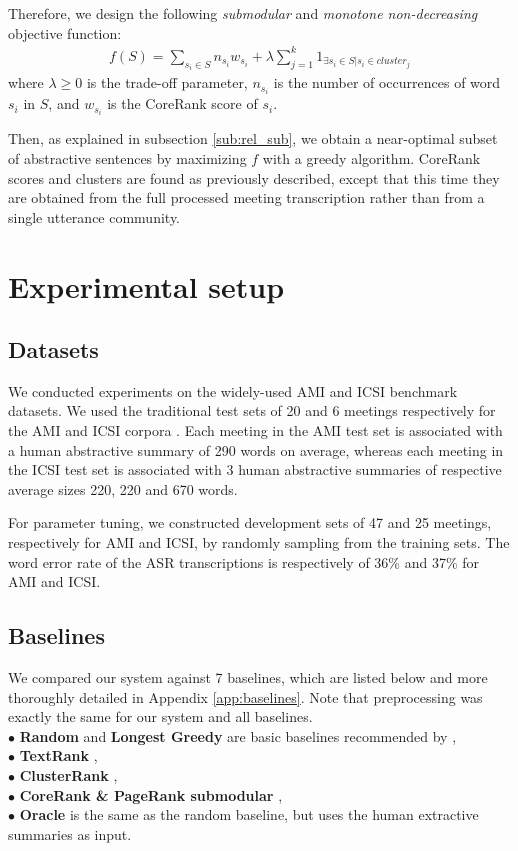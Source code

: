 \documentclass[11pt,a4paper]{article}
\begin{document}
Therefore, we design the following \textit{submodular} and \textit{monotone non-decreasing} objective function:
\begin{equation}
\begin{aligned}
f(S) = \sum_{s_i \in S} n_{s_i} w_{s_i} + \lambda \sum^k_{j = 1} 1_{\exists s_i \in S | s_i \in cluster_j}
\end{aligned}
\label{eq:obj}
\end{equation}
where $\lambda \geq 0$ is the trade-off parameter, $n_{s_i}$ is the number of occurrences of word $s_i$ in $S$, and $w_{s_i}$ is the CoreRank score of $s_i$.

Then, as explained in subsection \ref{sub:rel_sub}, we obtain a near-optimal subset of abstractive sentences by maximizing $f$ with a greedy algorithm. CoreRank scores and clusters are found as previously described, except that this time they are obtained from the full processed meeting transcription rather than from a single  utterance community.

\section{Experimental setup}

\subsection{Datasets} \label{subsec:datasets}
We conducted experiments on the widely-used AMI \cite{mccowan2005ami} and ICSI \cite{janin2003icsi} benchmark datasets. We used the traditional test sets of 20 and 6 meetings respectively for the AMI and ICSI corpora \cite{riedhammer2008packing}. Each meeting in the AMI test set is associated with a human abstractive summary of 290 words on average, whereas each meeting in the ICSI test set is associated with 3 human abstractive summaries of respective average sizes 220, 220 and 670 words. 

For parameter tuning, we constructed development sets of 47 and 25 meetings, respectively for AMI and ICSI, by randomly sampling from the training sets. The word error rate of the ASR transcriptions is respectively of 36\% and 37\% for AMI and ICSI.

\subsection{Baselines}
We compared our system against 7 baselines, which are listed below and more thoroughly detailed in Appendix \ref{app:baselines}. Note that preprocessing was exactly the same for our system and all baselines. \\
$\bullet$ \textbf{Random} and \textbf{Longest Greedy} are basic baselines recommended by  \cite{riedhammer2008packing}, \\ 
$\bullet$ \textbf{TextRank} \cite{mihalcea2004textrank}, \\
$\bullet$ \textbf{ClusterRank} \cite{garg2009clusterrank}, \\
$\bullet$ \textbf{CoreRank \& PageRank submodular} \cite{tixier2017combining}, \\
$\bullet$ \textbf{Oracle} is the same as the random baseline, but uses the human extractive summaries as input.
\end{document}

